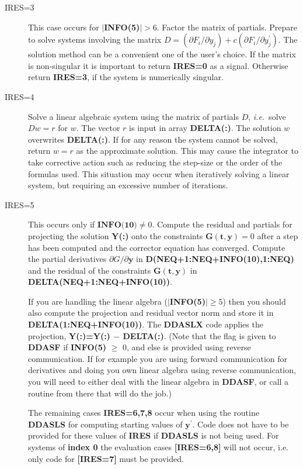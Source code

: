 \documentclass[twoside]{MATH77}
\begin{document}
\begin{description}
\item[IRES=3] This case occurs for $|$\textbf{INFO(5)}$| > 6$. Factor the
  matrix of partials.  Prepare to solve systems involving the matrix
  $D=(\partial F_{i}/\partial y_{j})+c (\partial F_{i}/\partial
  y_{j}^{\prime}).$ The solution method can be a convenient one of the user's
  choice.  If the matrix is non-singular it is important to return
  \textbf{IRES=0} as a signal.  Otherwise return \textbf{IRES=3}, if the
  system is numerically singular.
  
\item[IRES=4] Solve a linear algebraic system using the matrix of partials
  $D$, {\em i.e.}\ solve $Dw=r$ for $w$.  The vector $r$ is input in array
  \textbf{DELTA(:)}.  The solution $w$ overwrites \textbf{DELTA(:)}.  If for
  any reason the system cannot be solved, return $w=r$ as the approximate
  solution.  This may cause the integrator to take corrective action such as
  reducing the step-size or the order of the formulas used.  This situation
  may occur when iteratively solving a linear system, but requiring an
  excessive number of iterations.
  
\item[IRES=5] This occurs only if $\textbf{INFO(10)} \neq 0$. Compute
  the residual and partials for projecting the solution \textbf{Y(:)}
  onto the constraints $\mathbf{G(t,y)}=0$ after a step has been
  computed and the corrector equation has converged.  Compute the
  partial derivatives $\partial G / \partial \mathbf{y}$ in
  \textbf{D(NEQ+1:NEQ+INFO(10),1:NEQ)} and the residual of the
  constraints $\mathbf{G(t,y)}$ in \textbf{DELTA(NEQ+1:NEQ+INFO(10))}.

  If you are handling the linear algebra ($|$\textbf{INFO(5)}$| \geq 5$)
  then you should also compute the projection and residual vector norm
  and store it in \textbf{DELTA(1:NEQ+INFO(10))}.  The \textbf{DDASLX} code applies
  the projection,
  \textbf{Y(:)=Y(:) $-$ DELTA(:)}.  (Note that the flag is given to
  \textbf{DDASF} if \textbf{INFO(5)} $\geq$ 0, and else is provided using
  reverse communication.  If for example you are using forward communication
  for derivatives and doing you own linear algebra using reverse
  communication, you will need to either deal with the linear algebra in
  \textbf{DDASF}, or call a routine from there that will do the job.)

  The remaining cases \textbf{IRES=6,7,8} occur when using the routine \textbf{DDASLS}
  for computing starting values of $\mathbf{y^{\prime}}$.  Code does not have to be provided for these
  values of \textbf{IRES} if \textbf{DDASLS} is not being used.  For systems
  of \textbf{index 0} the evaluation cases \textbf{[IRES=6,8]} will not occur, i.e. only code for 
  \textbf{[IRES=7]} must be provided.


\end{description}
\end{document}
